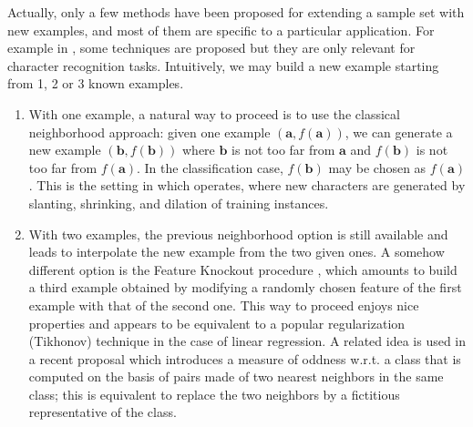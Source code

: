Actually, only a few methods have been proposed for extending a sample set with
new examples, and most of them are specific to a particular application. For
example in \cite{CanPerArlLlo06}, some techniques are proposed but they are
only relevant for character recognition tasks. Intuitively, we may build a new
example starting from 1, 2 or 3 known examples.
\begin{enumerate}
\item With one example, a natural way to proceed is to use the classical
  neighborhood approach: given one  example $(\mathbf{a},f(\mathbf{a}))$, we
    can generate a new example $(\mathbf{b},f(\mathbf{b}))$ where  $\mathbf{b}$
    is not too far from $\mathbf{a}$ and $f(\mathbf{b})$ is not too far from
    $f(\mathbf{a})$. In the classification case, $f(\mathbf{b})$ may be chosen
    as $f(\mathbf{a})$. This is the setting in which \cite{CanPerArlLlo06}
    operates, where new characters are generated by slanting, shrinking, and
    dilation of training instances.
\item With two examples, the previous neighborhood option is still available
  and leads to interpolate the new example from the two given ones.  A somehow
    different option is the Feature Knockout procedure \cite{WolMar04}, which
    amounts to build a third example obtained by modifying a randomly chosen
    feature of the first example with that of the second one.  This way to
    proceed enjoys nice properties and appears to be equivalent to a popular
    regularization (Tikhonov) technique in the case of linear regression.  A
    related idea is used in a recent proposal \cite{BouPraRicECAI16} which
    introduces a measure of oddness w.r.t. a class that is computed on the
    basis of pairs made of two nearest neighbors in the same class; this is
    equivalent to replace the two neighbors by a fictitious representative of
    the class.


\end{enumerate}

